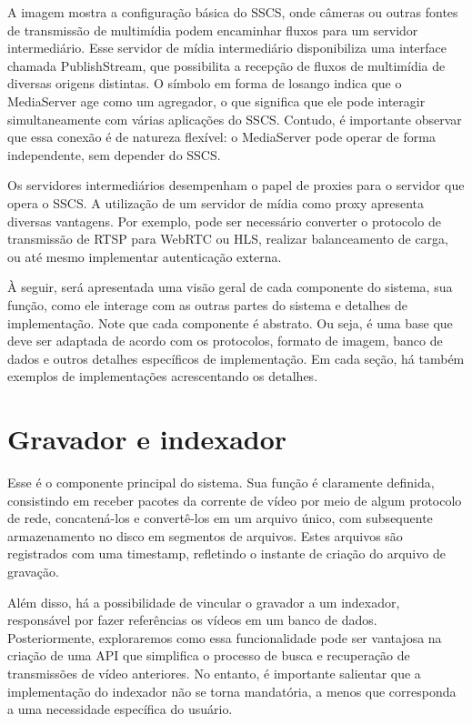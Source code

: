 \documentclass[12pt, %
openright, 
oneside, %
a4paper,    %
brazil]{facom-ufu-abntex2}
\begin{document}

A imagem mostra a configuração básica do SSCS, onde câmeras ou outras fontes de
transmissão de multimídia podem encaminhar fluxos para um servidor
intermediário. Esse servidor de mídia intermediário disponibiliza uma interface
chamada PublishStream, que possibilita a recepção de fluxos de multimídia de
diversas origens distintas. O símbolo em forma de losango indica que o
MediaServer age como um agregador, o que significa que ele pode interagir
simultaneamente com várias aplicações do SSCS. Contudo, é importante observar
que essa conexão é de natureza flexível: o MediaServer pode operar de forma
independente, sem depender do SSCS.

Os servidores intermediários desempenham o papel de proxies para o servidor que
opera o SSCS. A utilização de um servidor de mídia como proxy apresenta
diversas vantagens. Por exemplo, pode ser necessário converter o protocolo de
transmissão de RTSP para WebRTC ou HLS, realizar balanceamento de carga, ou até
mesmo implementar autenticação externa.

À seguir, será apresentada uma visão geral de cada componente do sistema, sua função, como ele interage
com as outras partes do sistema e detalhes de implementação. Note que cada componente é abstrato. Ou seja,
é uma base que deve ser adaptada de acordo com os protocolos, formato de imagem, banco de dados e outros detalhes
específicos de implementação. Em cada seção, há também exemplos de implementações acrescentando os detalhes.

\section{Gravador e indexador}

Esse é o componente principal do sistema. Sua função é claramente definida,
consistindo em receber pacotes da corrente de vídeo por meio de algum protocolo
de rede, concatená-los e convertê-los em um arquivo único, com subsequente
armazenamento no disco em segmentos de arquivos. Estes arquivos são registrados
com uma timestamp, refletindo o instante de criação do arquivo de gravação.

Além disso, há a possibilidade de vincular o gravador a um indexador,
responsável por fazer referências os vídeos em um banco de dados.
Posteriormente, exploraremos como essa funcionalidade pode ser vantajosa na
criação de uma API que simplifica o processo de busca e recuperação de
transmissões de vídeo anteriores. No entanto, é importante salientar que a
implementação do indexador não se torna mandatória, a menos que corresponda a
uma necessidade específica do usuário.
\end{document}

